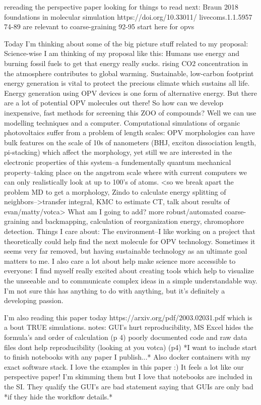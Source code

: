 \documentclass{article}
\begin{document}
rereading the perspective paper \cite{Jankowski2019} looking for things to read next:
Braun 2018 foundations in molecular simulation
https://doi.org/10.33011/ livecoms.1.1.5957
74-89 are relevant to coarse-graining
92-95 start here for opvs

Today I'm thinking about some of the big picture stuff related to my proposal:
Science-wise I am thinking of my proposal like this: Humans use energy and burning fossil fuels to get that energy really sucks. rising CO2 concentration in the atmosphere contributes to global warming. Sustainable, low-carbon footprint energy generation is vital to protect the precious climate which sustains all life. Energy generation using OPV devices is one form of alternative energy. But there are a lot of potential OPV molecules out there! So how can we develop inexpensive, fast methods for screening this ZOO of compounds? Well we can use modelling techniques and a computer. Computational simulations of organic photovoltaics suffer from a problem of length scales: OPV morphologies can have bulk features on the scale of 10s of nanometers (BHJ, exciton dissociation length, pi-stacking) which affect the morphology, yet still we are interested in the electronic properties of this system--a fundementally quantum mechanical property--taking place on the angstrom scale where with current computers we can only realistically look at up to 100's of atoms. <so we break apart the problem MD to get a morphology, Zindo to calculate energy splitting of neighbors-->transfer integral, KMC to estimate CT, talk about results of evan/matty/votca> What am I going to add? more robust/automated coarse-graining and backmapping, calculation of reorganization energy, chromophore detection.
Things I care about: The environment--I like working on a project that theoretically could help find the next molecule for OPV technology. Sometimes it seems very far removed, but having sustainable technology as an ultimate goal matters to me. I also care a lot about help make science more accessible to everyone: I find myself really excited about creating tools which help to visualize the unseeable and to communicate complex ideas in a simple understandable way. I'm not sure this has anything to do with anything, but it's definitely a developing passion.

I'm also reading this paper today https://arxiv.org/pdf/2003.02031.pdf which is a bout TRUE simulations.
notes:
GUI's hurt reproducibility, MS Excel hides the formula's and order of calculation (p 4)
poorly documented code and raw data files dont help reproducibility (looking at you votca) (p4)
*I want to include start to finish notebooks with any paper I publish...* Also docker containers with my exact software stack.
I love the examples in this paper :) It feels a lot like our perspective paper! I'm skimming them but I love that notebooks are included in the SI.
They qualify the GUI's are bad statement saying that GUIs are only bad *if they hide the workflow details.* 
\end{document}
